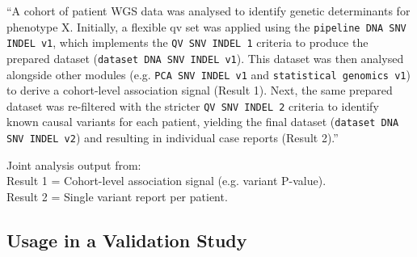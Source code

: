 ``A cohort of patient WGS data was analysed to identify genetic determinants for phenotype X. Initially, a flexible \ac{qv} set was applied using the 
\colorbox{colorSUNSET1!30}{\texttt{pipeline DNA SNV INDEL v1}}, which implements the \colorbox{colorSUNSET2!60}{\texttt{QV SNV INDEL 1}} criteria to produce the prepared dataset (\colorbox{colorSUNSET3!30}{\texttt{dataset DNA SNV INDEL v1}}). This dataset was then analysed alongside other modules (e.g. \colorbox{colorSUNSET4!30}{\texttt{PCA SNV INDEL v1}} and \colorbox{colorSUNSET5!30}{\texttt{statistical genomics v1}}) to derive a cohort-level association signal (Result 1). Next, the same prepared dataset was re-filtered with the stricter \colorbox{colorSUNSET2!60}{\texttt{QV SNV INDEL 2}} criteria to identify known causal variants for each patient, yielding the final dataset (\colorbox{colorSUNSET3!30}{\texttt{dataset DNA SNV INDEL v2}}) and resulting in individual case reports (Result 2).''

\begin{tcolorbox}[
    colback=white!0,
    colframe=black,
    boxrule=1pt,
    arc=1mm,
    outer arc=1mm,
    title=\textbf{\refstepcounter{myboxcounter}\label{box:pipe}Box \themyboxcounter: Example diagrammatic representation}
]
\medskip

Joint analysis output from:\\
Result 1 = Cohort-level association signal (e.g. variant P-value).\\
Result 2 = Single variant report per patient.
\end{tcolorbox}


\subsection{Usage in a Validation Study}

